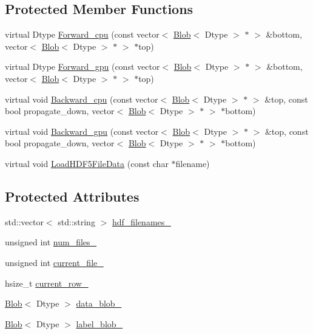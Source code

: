 \subsection*{Protected Member Functions}
\begin{DoxyCompactItemize}
\item 
virtual Dtype \hyperlink{classcaffe_1_1_h_d_f5_data_layer_afb70fc6efdfffa6ee155abe193b53e3d}{Forward\+\_\+cpu} (const vector$<$ \hyperlink{classcaffe_1_1_blob}{Blob}$<$ Dtype $>$ $\ast$ $>$ \&bottom, vector$<$ \hyperlink{classcaffe_1_1_blob}{Blob}$<$ Dtype $>$ $\ast$ $>$ $\ast$top)
\item 
virtual Dtype \hyperlink{classcaffe_1_1_h_d_f5_data_layer_ab1413b32f9b5ad2182c7fd88b85240c3}{Forward\+\_\+gpu} (const vector$<$ \hyperlink{classcaffe_1_1_blob}{Blob}$<$ Dtype $>$ $\ast$ $>$ \&bottom, vector$<$ \hyperlink{classcaffe_1_1_blob}{Blob}$<$ Dtype $>$ $\ast$ $>$ $\ast$top)
\item 
virtual void \hyperlink{classcaffe_1_1_h_d_f5_data_layer_a2c44e32bcde368d4afbb2b9f68f4e3f8}{Backward\+\_\+cpu} (const vector$<$ \hyperlink{classcaffe_1_1_blob}{Blob}$<$ Dtype $>$ $\ast$ $>$ \&top, const bool propagate\+\_\+down, vector$<$ \hyperlink{classcaffe_1_1_blob}{Blob}$<$ Dtype $>$ $\ast$ $>$ $\ast$bottom)
\item 
virtual void \hyperlink{classcaffe_1_1_h_d_f5_data_layer_ac2528e6eea1bbcd1d6e3b0e35a7595b8}{Backward\+\_\+gpu} (const vector$<$ \hyperlink{classcaffe_1_1_blob}{Blob}$<$ Dtype $>$ $\ast$ $>$ \&top, const bool propagate\+\_\+down, vector$<$ \hyperlink{classcaffe_1_1_blob}{Blob}$<$ Dtype $>$ $\ast$ $>$ $\ast$bottom)
\item 
virtual void \hyperlink{classcaffe_1_1_h_d_f5_data_layer_a6fe59cc631f26f3323641ea480352119}{Load\+H\+D\+F5\+File\+Data} (const char $\ast$filename)
\end{DoxyCompactItemize}
\subsection*{Protected Attributes}
\begin{DoxyCompactItemize}
\item 
std\+::vector$<$ std\+::string $>$ \hyperlink{classcaffe_1_1_h_d_f5_data_layer_ae255f1e97fc8140bfeb7e3325f431f5a}{hdf\+\_\+filenames\+\_\+}
\item 
unsigned int \hyperlink{classcaffe_1_1_h_d_f5_data_layer_aa6154c78cd3f375f1bba8dc544362e59}{num\+\_\+files\+\_\+}
\item 
unsigned int \hyperlink{classcaffe_1_1_h_d_f5_data_layer_aa13b2e2012927eb433d007eb0cfcf8a7}{current\+\_\+file\+\_\+}
\item 
hsize\+\_\+t \hyperlink{classcaffe_1_1_h_d_f5_data_layer_a375f447a432bcd2ba94859b5b270ac96}{current\+\_\+row\+\_\+}
\item 
\hyperlink{classcaffe_1_1_blob}{Blob}$<$ Dtype $>$ \hyperlink{classcaffe_1_1_h_d_f5_data_layer_a9a70b53ef7435b4d565736fe8e3881ac}{data\+\_\+blob\+\_\+}
\item 
\hyperlink{classcaffe_1_1_blob}{Blob}$<$ Dtype $>$ \hyperlink{classcaffe_1_1_h_d_f5_data_layer_a15f4061897306968bb41c9300ab9250b}{label\+\_\+blob\+\_\+}
\end{DoxyCompactItemize}


